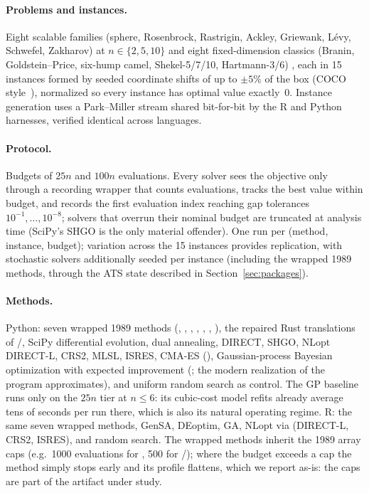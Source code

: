 \paragraph{Problems and instances.} Eight scalable families (sphere,
Rosenbrock, Rastrigin, Ackley, Griewank, L\'evy, Schwefel, Zakharov) at
$n\in\{2,5,10\}$ and eight fixed-dimension classics (Branin,
Goldstein--Price, six-hump camel, Shekel-5/7/10, Hartmann-3/6)
\cite{surjanovic2013library}, each in 15 instances formed by seeded
coordinate shifts of up to $\pm5\%$ of the box (COCO
style~\cite{hansen2021coco}), normalized so every instance has optimal
value exactly~0. Instance generation uses a Park--Miller stream shared
bit-for-bit by the R and Python harnesses, verified identical across
languages.

\paragraph{Protocol.} Budgets of $25n$ and $100n$ evaluations. Every
solver sees the objective only through a recording wrapper that counts
evaluations, tracks the best value within budget, and records the first
evaluation index reaching gap tolerances $10^{-1},\dots,10^{-8}$;
solvers that overrun their nominal budget are truncated at analysis time
(SciPy's SHGO is the only material offender). One run per (method,
instance, budget); variation across the 15 instances provides
replication, with stochastic solvers additionally seeded per instance
(including the wrapped 1989 methods, through the ATS state described in
Section~\ref{sec:packages}).

\paragraph{Methods.} Python: seven wrapped 1989 methods
(, , , , ,
, ), the repaired Rust translations of
/, SciPy differential evolution, dual annealing,
DIRECT, SHGO, NLopt DIRECT-L, CRS2, MLSL, ISRES, CMA-ES
(), Gaussian-process Bayesian optimization with expected
improvement (; the modern realization of the
program  approximates), and uniform random search as
control. The GP baseline runs only on the $25n$ tier at $n\le 6$: its
cubic-cost model refits already average tens of seconds per run there,
which is also its natural operating regime. R: the same seven
wrapped methods, GenSA, DEoptim, GA, NLopt via  (DIRECT-L,
CRS2, ISRES), and random search. The wrapped methods inherit the 1989
array caps (e.g.\ 1000 evaluations for , 500 for
/); where the budget exceeds a cap the method
simply stops early and its profile flattens, which we report as-is:
the caps are part of the artifact under study.

